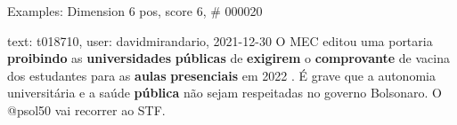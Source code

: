 \begin{frame}{Examples: Dimension 6 pos, score 6, \# 000020}
\footnotesize
\begin{exampleblock}{text: t018710, user: davidmirandario, 2021-12-30}
O MEC editou uma portaria \textbf{proibindo} as \textbf{universidades} 
\textbf{públicas} de \textbf{exigirem} o \textbf{comprovante} de vacina dos 
estudantes para as \textbf{aulas} \textbf{presenciais} em 2022 . É grave que a 
autonomia universitária e a saúde \textbf{pública} não sejam respeitadas no 
governo Bolsonaro. O @psol50 vai recorrer ao STF. 
\end{exampleblock}
\end{frame}
